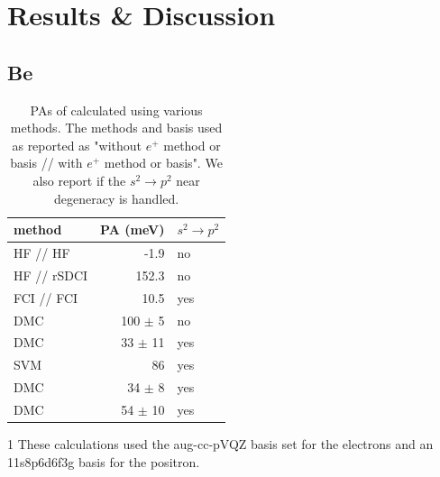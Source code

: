 \section{Results \& Discussion}

\subsection{Be}
\begin{table}
    \begin{threeparttable}
    \caption{\label{tab:wfn_BE} PAs of  calculated using various methods. The methods and basis used as reported as "without $e^{+}$ method or basis // with $e^{+}$ method or basis". We also report if the $s^2 \rightarrow p^2$ near degeneracy is handled.}
    \begin{tabular}{lrl}
method                          & PA (meV)    & $s^2 \rightarrow p^2$ \\ \hline
HF // HF    \tnote{1}           & -1.9        & no  \\
HF // rSDCI \tnote{1}           & 152.3       & no  \\
FCI // FCI  \tnote{1}           & 10.5        & yes \\ \hline

DMC\cite{10.1063/1.1486447}              & 100 $\pm$ 5 & no  \\
DMC\cite{10.1063/1.1486447}              & 33 $\pm$ 11 & yes \\
SVM\cite{10.4208/jams.071510.072110a}    & 86          & yes \\
DMC\cite{10.1021/acs.jctc.1c01193}       & 34 $\pm$ 8  & yes \\
DMC\cite{10.1021/acs.jctc.1c01193}       & 54 $\pm$ 10 & yes \\
\end{tabular}
\begin{tablenotes}
  \item [1] These calculations used the aug-cc-pVQZ basis set for the electrons and an 11s8p6d6f3g basis for the positron.
\end{tablenotes}
\end{threeparttable}
\end{table}

